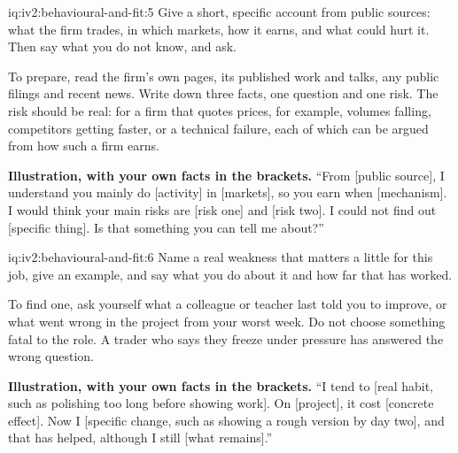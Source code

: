 \begin{solution}{iq:iv2:behavioural-and-fit:5}
Give a short, specific account from public sources: what the firm trades, in which markets, how it earns, and what could hurt it. Then say what you do not know, and ask.

To prepare, read the firm's own pages, its published work and talks, any public filings and recent news. Write down three facts, one question and one risk. The risk should be real: for a firm that quotes prices, for example, volumes falling, competitors getting faster, or a technical failure, each of which can be argued from how such a firm earns.

\textbf{Illustration, with your own facts in the brackets.} ``From [public source], I understand you mainly do [activity] in [markets], so you earn when [mechanism]. I would think your main risks are [risk one] and [risk two]. I could not find out [specific thing]. Is that something you can tell me about?''

\end{solution}

\begin{solution}{iq:iv2:behavioural-and-fit:6}
Name a real weakness that matters a little for this job, give an example, and say what you do about it and how far that has worked.

To find one, ask yourself what a colleague or teacher last told you to improve, or what went wrong in the project from your worst week. Do not choose something fatal to the role. A trader who says they freeze under pressure has answered the wrong question.

\textbf{Illustration, with your own facts in the brackets.} ``I tend to [real habit, such as polishing too long before showing work]. On [project], it cost [concrete effect]. Now I [specific change, such as showing a rough version by day two], and that has helped, although I still [what remains].''

\end{solution}

